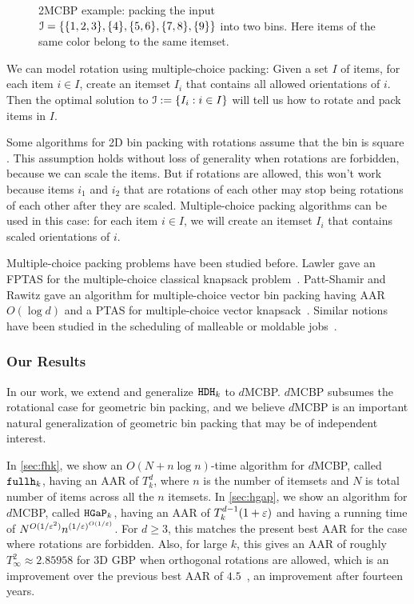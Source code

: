 \begin{figure}[htb]
\centering

\caption[2MCBP example]{2MCBP example: packing the input
$\mathcal{I} = \{\{1, 2, 3\}, \{4\}, \{5, 6\}, \{7, 8\}, \{9\}\}$ into two bins.
Here items of the same color belong to the same itemset.}
\label{fig:2mcbp}
\end{figure}

We can model rotation using multiple-choice packing:
Given a set $I$ of items, for each item $i \in I$,
create an itemset $I_i$ that contains all allowed orientations of $i$.
Then the optimal solution to $\mathcal{I} := \{I_i: i \in I\}$
will tell us how to rotate and pack items in $I$.

Some algorithms for 2D bin packing with rotations assume that
the bin is square \cite{rna,jansen2016new,bansal2014binpacking}.
This assumption holds without loss of generality when rotations are forbidden,
because we can scale the items.
But if rotations are allowed, this won't work because
items $i_1$ and $i_2$ that are rotations of each other
may stop being rotations of each other after they are scaled.
Multiple-choice packing algorithms can be used in this case:
for each item $i \in I$, we will create an itemset $I_i$ that
contains scaled orientations of $i$.

Multiple-choice packing problems have been studied before.
Lawler gave an FPTAS for the multiple-choice classical knapsack problem~\cite{lawler1979fast}.
Patt-Shamir and Rawitz gave an algorithm for multiple-choice vector bin packing having
AAR $O(\log d)$ and a PTAS for multiple-choice vector knapsack~\cite{patt2012vector}.
Similar notions have been studied in the scheduling of
malleable or moldable jobs~\cite{ZhangJ07,Jansen12}.

\subsubsection{Our Results}

In our work, we extend and generalize $\operatorname{\mathtt{HDH}}_{k}$ to $d$MCBP.
$d$MCBP subsumes the rotational case for geometric bin packing,
and we believe $d$MCBP is an important natural generalization
of geometric bin packing that may be of independent interest.

In \cref{sec:fhk}, we show an $O(N + n\log n)$-time algorithm for $d$MCBP,
called $\operatorname{\mathtt{fullh}}_{k}$, having an AAR of $T_k^d$, where $n$ is the number of itemsets
and $N$ is total number of items across all the $n$ itemsets.
In \cref{sec:hgap}, we show an algorithm for $d$MCBP, called $\operatorname{\mathtt{HGaP}}_{k}$, having an AAR of
$T_k^{d-1}(1+\varepsilon)$ and having a running time of $N^{O(1/\varepsilon^2)}n^{(1/\varepsilon)^{O(1/\varepsilon)}}$.
For $d \ge 3$, this matches the present best AAR for the case
where rotations are forbidden.
Also, for large $k$, this gives an AAR of roughly $T_{\infty}^2 \approx 2.85958$
for 3D GBP when orthogonal rotations are allowed,
which is an improvement over the previous best AAR of $4.5$~\cite{epstein2006side},
an improvement after fourteen years.

